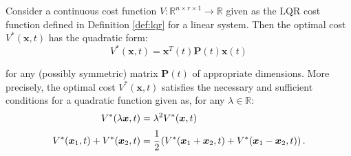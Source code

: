 \documentclass[a4paper,11pt]{book}
\numberwithin{figure}{chapter}
\numberwithin{equation}{chapter}
\numberwithin{table}{chapter}
\newtheorem{theorem}{Theorem}[chapter]
\theoremstyle{definition}
\newcounter{boxed-theorem}
\newenvironment{boxed-theorem}[1]
{\begin{shaded} \begin{theorem}{#1}}
{\end{theorem} \end{shaded}}
\newcounter{boxed-definition}
\begin{document}
\begin{boxed-theorem}{} \label{th:costQuadraForm}
    Consider a continuous cost function $V : \mathbb{R}^{n \times r \times 1} \rightarrow \mathbb{R}$ given as the LQR cost function defined in Definition \ref{def:lqr} for a linear system. Then the optimal cost $V^*(\bm{x}, t)$ has the quadratic form:
    \begin{equation}
        V^*(\bm{x}, t) = \bm{x}^T(t) \bm{P}(t) \bm{x}(t)
    \end{equation}
    
\noindent for any (possibly symmetric) matrix $\bm{P}(t)$ of appropriate dimensions. More precisely, the optimal cost $V^*(\bm{x}, t)$ satisfies the necessary and sufficient conditions for a quadratic function given as, for any $\lambda \in \mathbb{R}$:
    \begin{align} 
        V^*(\lambda \bm{x}, t) &= \lambda^2 V^*(\bm{x}, t) \label{eq:costQuadraForm021} \\ 
        V^*(\bm{x}_1 , t) + V^*(\bm{x}_2 , t) &= \cfrac{1}{2} \left( V^*(\bm{x}_1 + \bm{x}_2 , t) + V^*(\bm{x}_1 - \bm{x}_2 , t) \right) \label{eq:costQuadraForm022}
    .\end{align}
\end{boxed-theorem}
\end{document}
